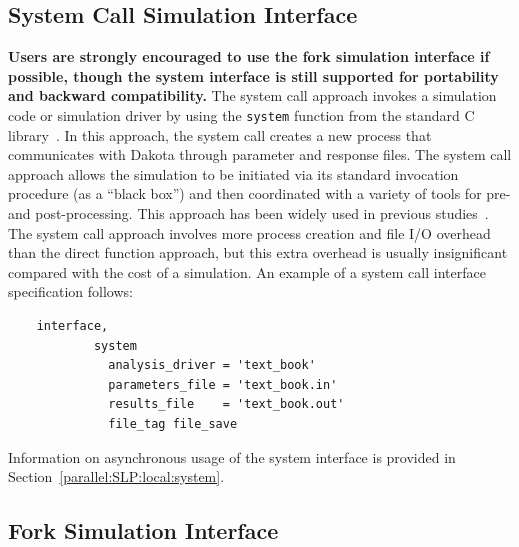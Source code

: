 \subsection{System Call Simulation Interface}\label{interfaces:system}

{\bf Users are strongly encouraged to use the fork simulation
  interface if possible, though the system interface is still
  supported for portability and backward compatibility.}  The system
call approach invokes a simulation code or simulation driver by using
the \texttt{system} function from the standard C
library~\cite{Ker88}. In this approach, the system call creates a new
process that communicates with Dakota through parameter and response
files.  The system call approach allows the simulation to be initiated
via its standard invocation procedure (as a ``black box'') and then
coordinated with a variety of tools for pre- and post-processing.
This approach has been widely used in previous
studies~\cite{Eld96a,Eld96b,Eld98b}. The system call approach involves
more process creation and file I/O overhead than the direct function
approach, but this extra overhead is usually insignificant compared
with the cost of a simulation.  An example of a system call interface
specification follows:
\begin{small}
\begin{verbatim}
    interface,
            system
              analysis_driver = 'text_book'
              parameters_file = 'text_book.in'
              results_file    = 'text_book.out'
              file_tag file_save
\end{verbatim}
\end{small}

Information on asynchronous usage of the system interface is provided in
Section~\ref{parallel:SLP:local:system}.

\subsection{Fork Simulation Interface}\label{interfaces:fork}

